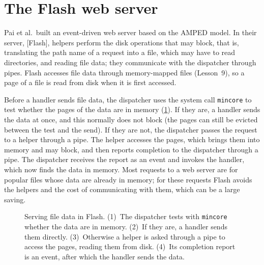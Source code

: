 \documentclass[../main.tex]{subfiles}
\begin{document}
\section{The Flash web server}
\label{sec:l06-flash}

Pai et al.\ built an event-driven web server based on the AMPED
model.  In their server,
[Flash], helpers perform the disk operations that may block,
that is, translating the path name of a request into a file, which may have
to read directories, and reading file data; they communicate with the
dispatcher through pipes.  Flash accesses file data through memory-mapped
files (Lesson~9), so a page of a file is read from disk when it is first
accessed.

Before a handler sends file data, the dispatcher uses the system call
\texttt{mincore} to test whether the pages of the data are in memory
(\cref{fig:l06-flash}).  If they are, a handler sends the data
at once, and this normally does not block (the pages can still be evicted
between the test and the send).  If they are not, the dispatcher passes the
request to a helper through a pipe.  The helper accesses the pages, which
brings them into memory and may block, and then reports completion to the
dispatcher through a pipe.
The dispatcher receives the report as an event and invokes the handler,
which now finds the data in memory.  Most requests to a web server are for
popular files whose data are already in memory; for these requests Flash
avoids the helpers and the cost of communicating with them, which can be a
large saving.

\begin{figure}[htbp]
  \centering
  
  \caption{Serving file data in Flash.  (1)~The dispatcher tests with
    \texttt{mincore} whether the data are in memory.  (2)~If they are, a
    handler sends them directly.  (3)~Otherwise a helper is asked through a
    pipe to access the pages, reading them from disk.  (4)~Its completion
    report is an event, after which the handler sends the data.}
  \label{fig:l06-flash}
\end{figure}
\end{document}
